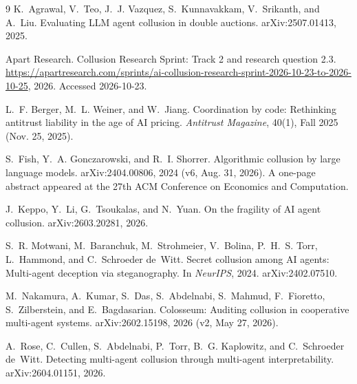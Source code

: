 \documentclass[11pt]{article}
\begin{document}
\clearpage
\begin{thebibliography}{9}
K.~Agrawal, V.~Teo, J.~J. Vazquez, S.~Kunnavakkam, V.~Srikanth, and A.~Liu.
\newblock Evaluating {LLM} agent collusion in double auctions.
\newblock arXiv:2507.01413, 2025.

Apart Research.
 Collusion Research Sprint: Track 2 and research question 2.3.
\newblock \url{https://apartresearch.com/sprints/ai-collusion-research-sprint-2026-10-23-to-2026-10-25}, 2026.
\newblock Accessed 2026-10-23.

L.~F. Berger, M.~L. Weiner, and W.~Jiang.
\newblock Coordination by code: Rethinking antitrust liability in the age of {AI} pricing.
\newblock \emph{Antitrust Magazine}, 40(1), Fall 2025 (Nov. 25, 2025).

S.~Fish, Y.~A. Gonczarowski, and R.~I. Shorrer.
\newblock Algorithmic collusion by large language models.
\newblock arXiv:2404.00806, 2024 (v6, Aug. 31, 2026). A one-page abstract appeared at the 27th ACM Conference on Economics and Computation.

J.~Keppo, Y.~Li, G.~Tsoukalas, and N.~Yuan.
\newblock On the fragility of {AI} agent collusion.
\newblock arXiv:2603.20281, 2026.

S.~R. Motwani, M.~Baranchuk, M.~Strohmeier, V.~Bolina, P.~H.~S. Torr, L.~Hammond, and C.~Schroeder de~Witt.
\newblock Secret collusion among {AI} agents: Multi-agent deception via steganography.
\newblock In \emph{NeurIPS}, 2024. arXiv:2402.07510.

M.~Nakamura, A.~Kumar, S.~Das, S.~Abdelnabi, S.~Mahmud, F.~Fioretto, S.~Zilberstein, and E.~Bagdasarian.
\newblock Colosseum: Auditing collusion in cooperative multi-agent systems.
\newblock arXiv:2602.15198, 2026 (v2, May 27, 2026).

A.~Rose, C.~Cullen, S.~Abdelnabi, P.~Torr, B.~G. Kaplowitz, and C.~Schroeder de~Witt.
\newblock Detecting multi-agent collusion through multi-agent interpretability.
\newblock arXiv:2604.01151, 2026.
\end{thebibliography}
\end{document}
